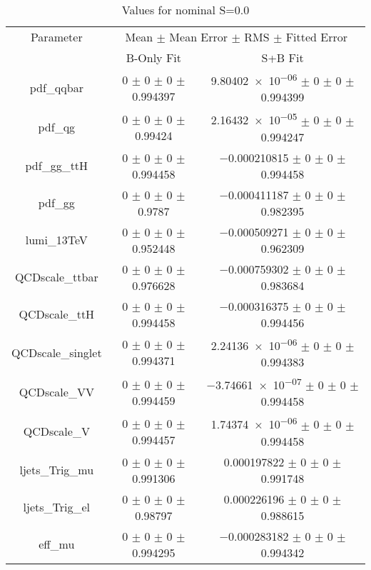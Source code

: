\begin{table}
\centering
\caption{Values for nominal S=0.0}
\begin{tabular}{ccc}
\toprule
Parameter & \multicolumn{2}{c}{Mean $\pm$ Mean Error $\pm$ RMS $\pm$ Fitted Error}\\
 & B-Only Fit & S+B Fit\\
\midrule
pdf\_qqbar & \num{0} $\pm$ \num{0} $\pm$ \num{0} $\pm$ \num{0.994397} & \num{9.80402e-06} $\pm$ \num{0} $\pm$ \num{0} $\pm$ \num{0.994399}\\
pdf\_qg & \num{0} $\pm$ \num{0} $\pm$ \num{0} $\pm$ \num{0.99424} & \num{2.16432e-05} $\pm$ \num{0} $\pm$ \num{0} $\pm$ \num{0.994247}\\
pdf\_gg\_ttH & \num{0} $\pm$ \num{0} $\pm$ \num{0} $\pm$ \num{0.994458} & \num{-0.000210815} $\pm$ \num{0} $\pm$ \num{0} $\pm$ \num{0.994458}\\
pdf\_gg & \num{0} $\pm$ \num{0} $\pm$ \num{0} $\pm$ \num{0.9787} & \num{-0.000411187} $\pm$ \num{0} $\pm$ \num{0} $\pm$ \num{0.982395}\\
lumi\_13TeV & \num{0} $\pm$ \num{0} $\pm$ \num{0} $\pm$ \num{0.952448} & \num{-0.000509271} $\pm$ \num{0} $\pm$ \num{0} $\pm$ \num{0.962309}\\
QCDscale\_ttbar & \num{0} $\pm$ \num{0} $\pm$ \num{0} $\pm$ \num{0.976628} & \num{-0.000759302} $\pm$ \num{0} $\pm$ \num{0} $\pm$ \num{0.983684}\\
QCDscale\_ttH & \num{0} $\pm$ \num{0} $\pm$ \num{0} $\pm$ \num{0.994458} & \num{-0.000316375} $\pm$ \num{0} $\pm$ \num{0} $\pm$ \num{0.994456}\\
QCDscale\_singlet & \num{0} $\pm$ \num{0} $\pm$ \num{0} $\pm$ \num{0.994371} & \num{2.24136e-06} $\pm$ \num{0} $\pm$ \num{0} $\pm$ \num{0.994383}\\
QCDscale\_VV & \num{0} $\pm$ \num{0} $\pm$ \num{0} $\pm$ \num{0.994459} & \num{-3.74661e-07} $\pm$ \num{0} $\pm$ \num{0} $\pm$ \num{0.994458}\\
QCDscale\_V & \num{0} $\pm$ \num{0} $\pm$ \num{0} $\pm$ \num{0.994457} & \num{1.74374e-06} $\pm$ \num{0} $\pm$ \num{0} $\pm$ \num{0.994458}\\
ljets\_Trig\_mu & \num{0} $\pm$ \num{0} $\pm$ \num{0} $\pm$ \num{0.991306} & \num{0.000197822} $\pm$ \num{0} $\pm$ \num{0} $\pm$ \num{0.991748}\\
ljets\_Trig\_el & \num{0} $\pm$ \num{0} $\pm$ \num{0} $\pm$ \num{0.98797} & \num{0.000226196} $\pm$ \num{0} $\pm$ \num{0} $\pm$ \num{0.988615}\\
eff\_mu & \num{0} $\pm$ \num{0} $\pm$ \num{0} $\pm$ \num{0.994295} & \num{-0.000283182} $\pm$ \num{0} $\pm$ \num{0} $\pm$ \num{0.994342}\\

\end{tabular}
\end{table}
